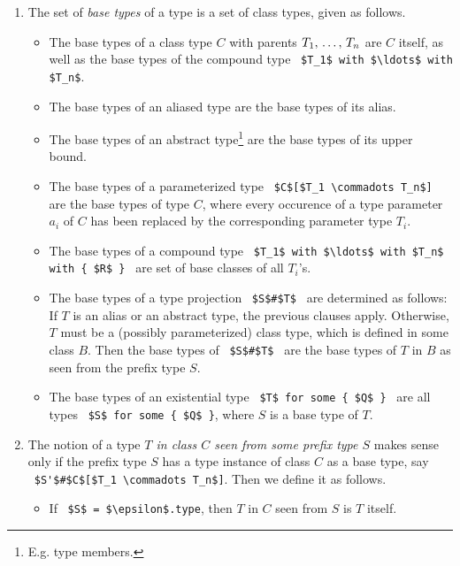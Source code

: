 \begin{enumerate}
  \item  The set of {\em base types} of a type is a set of class types, given as follows.
    \begin{itemize}
      \item The base types of a class type $C$ with parents $T_1 ,\, \ldots ,\, T_n$ are $C$ itself, as well as the base types of the compound type ~\lstinline!$T_1$ with $\ldots$ with $T_n$!. 

      \item The base types of an aliased type are the base types of its alias. 

      \item The base types of an abstract type\footnote{E.g. type members.} are the base types of its upper bound. 

      \item The base types of a parameterized type ~\lstinline!$C$[$T_1 \commadots T_n$]!~ are the base types of type $C$, where every occurence of a type parameter $a_i$ of $C$ has been replaced by the corresponding parameter type $T_i$. 

      \item The base types of a compound type ~\lstinline!$T_1$ with $\ldots$ with $T_n$ with { $R$ }!~ are set of base classes of all $T_i$'s. 

      \item The base types of a type projection ~\lstinline!$S$#$T$!~ are determined as follows: If $T$ is an alias or an abstract type, the previous clauses apply. Otherwise, $T$ must be a (possibly parameterized) class type, which is defined in some class $B$. Then the base types of ~\lstinline!$S$#$T$!~ are the base types of $T$ in $B$ as seen from the prefix type $S$. 

      \item The base types of an existential type ~\lstinline!$T$ for some { $Q$ }!~ are all types ~\lstinline!$S$ for some { $Q$ }!, where $S$ is a base type of $T$. 
    \end{itemize}

  \item The notion of a type {\em $T$ in class $C$ seen from some prefix type $S$} makes sense only if the prefix type $S$ has a type instance of class $C$ as a base type, say ~\lstinline!$S'$#$C$[$T_1 \commadots T_n$]!. Then we define it as follows.
    \begin{itemize}
      \item If ~\lstinline!$S$ = $\epsilon$.type!, then $T$ in $C$ seen from $S$ is $T$ itself. 


\end{itemize}
\end{enumerate}

